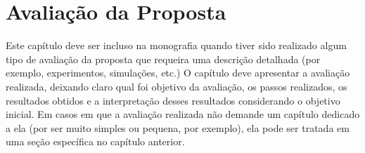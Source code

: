 \chapter{Avaliação da Proposta}
\label{sec-avaliacao}

Este capítulo deve ser incluso na monografia quando tiver sido realizado algum tipo de avaliação da proposta que requeira uma descrição detalhada (por exemplo, experimentos, simulações, etc.) O capítulo deve apresentar a avaliação realizada, deixando claro qual foi objetivo da avaliação, os passos realizados, os resultados obtidos e a interpretação desses resultados considerando o objetivo inicial. Em casos em que a avaliação realizada não demande um capítulo dedicado a ela (por ser muito simples ou pequena, por exemplo), ela pode ser tratada em uma seção específica no capítulo anterior.
